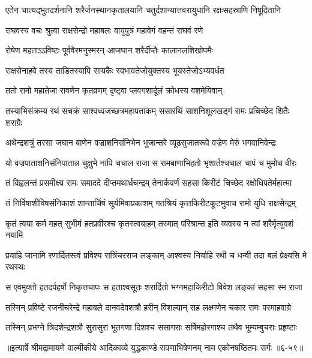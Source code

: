\twolineshloka
{एतेन चात्यद्भुतदर्शनानि शरैर्जनस्थानकृतालयानि}
{चतुर्दशान्यात्तवरायुधानि रक्षःसहस्राणि निषूदितानि} %

\twolineshloka
{राघवस्य वचः श्रुत्वा राक्षसेन्द्रो महाबलः}
{वायुपुत्रं महावेगं वहन्तं राघवं रणे} %

\twolineshloka
{रोषेण महताऽऽविष्टः पूर्ववैरमनुस्मरन्}
{आजघान शरैर्दीप्तैः कालानलशिखोपमैः} %

\twolineshloka
{राक्षसेनाहवे तस्य ताडितस्यापि सायकैः}
{स्वभावतेजोयुक्तस्य भूयस्तेजोऽभ्यवर्धत} %

\twolineshloka
{ततो रामो महातेजा रावणेन कृतव्रणम्}
{दृष्ट्वा प्लवगशार्दूलं क्रोधस्य वशमेयिवान्} %

\twolineshloka
{तस्याभिसंक्रम्य रथं सचक्रं साश्वध्वजच्छत्रमहापताकम्}
{ससारथिं साशनिशूलखड्गं रामः प्रचिच्छेद शितैः शराग्रैः} %

\twolineshloka
{अथेन्द्रशत्रुं तरसा जघान बाणेन वज्राशनिसंनिभेन}
{भुजान्तरे व्यूढसुजातरूपे वज्रेण मेरुं भगवानिवेन्द्रः} %

\twolineshloka
{यो वज्रपाताशनिसंनिपातान्न चुक्षुभे नापि चचाल राजा}
{स रामबाणाभिहतो भृशार्तश्चचाल चापं च मुमोच वीरः} %

\twolineshloka
{तं विह्वलन्तं प्रसमीक्ष्य रामः समाददे दीप्तमथार्धचन्द्रम्}
{तेनार्कवर्णं सहसा किरीटं चिच्छेद रक्षोधिपतेर्महात्मा} %

\twolineshloka
{तं निर्विषाशीविषसंनिकाशं शान्तार्चिषं सूर्यमिवाप्रकाशम्}
{गतश्रियं कृत्तकिरीटकूटमुवाच रामो युधि राक्षसेन्द्रम्} %

\twolineshloka
{कृतं त्वया कर्म महत् सुभीमं हतप्रवीरश्च कृतस्त्वयाहम्}
{तस्मात् परिश्रान्त इति व्यवस्य न त्वां शरैर्मृत्युवशं नयामि} %

\twolineshloka
{प्रयाहि जानामि रणार्दितस्त्वं प्रविश्य रात्रिंचरराज लङ्काम्}
{आश्वस्य निर्याहि रथी च धन्वी तदा बलं प्रेक्ष्यसि मे रथस्थः} %

\twolineshloka
{स एवमुक्तो हतदर्पहर्षो निकृत्तचापः स हताश्वसूतः}
{शरार्दितो भग्नमहाकिरीटो विवेश लङ्कां सहसा स्म राजा} %

\twolineshloka
{तस्मिन् प्रविष्टे रजनीचरेन्द्रे महाबले दानवदेवशत्रौ}
{हरीन् विशल्यान् सह लक्ष्मणेन चकार रामः परमाहवाग्रे} %

\twolineshloka
{तस्मिन् प्रभग्ने त्रिदशेन्द्रशत्रौ सुरासुरा भूतगणा दिशश्च}
{ससागराः सर्षिमहोरगाश्च तथैव भूम्यम्बुचराः प्रहृष्टाः} %


॥इत्यार्षे श्रीमद्रामायणे वाल्मीकीये आदिकाव्ये युद्धकाण्डे रावणाभिषेणनम् नाम एकोनषष्ठितमः सर्गः ॥६-५९॥
